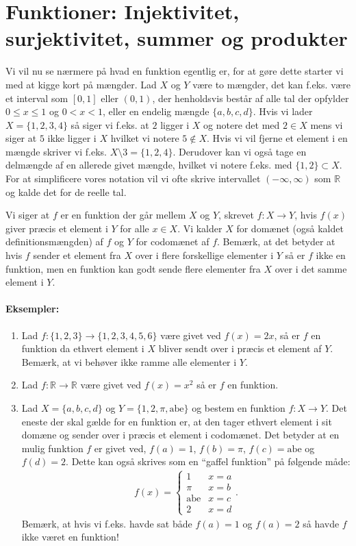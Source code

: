 \section{Funktioner: Injektivitet, surjektivitet, summer og produkter}
Vi vil nu se nærmere på hvad en funktion egentlig er, for at gøre dette starter vi med at kigge kort på mængder. Lad $X$ og $Y$ være to mængder, det kan f.eks. være et interval som $[0,1]$ eller $(0,1)$, der henholdsvis består af alle tal der opfylder $0 \leq x \leq 1$ og $0 < x < 1$, eller en endelig mængde $\{a,b,c,d\}$. Hvis vi lader $X = \{1,2,3,4\}$ så siger vi f.eks. at $2$ ligger i $X$ og notere det med $2 \in X$ mens vi siger at $5$ ikke ligger i $X$ hvilket vi notere $5 \not\in X$. Hvis vi vil fjerne et element i en mængde skriver vi f.eks. $X \setminus 3 = \{1,2,4\}$. Derudover kan vi også tage en delmængde af en allerede givet mængde, hvilket vi notere f.eks. med $\{1,2\} \subset X$. For at simplificere vores notation vil vi ofte skrive intervallet $(-\infty,\infty)$ som $\mathbb{R}$ og kalde det for de reelle tal. 



Vi siger at $f$ er en funktion der går mellem $X$ og $Y$, skrevet $f \colon X \to Y$, hvis $f(x)$ giver præcis et element i $Y$ for alle $x \in X$. Vi kalder $X$ for domænet (også kaldet definitionsmængden) af $f$ og $Y$ for codomænet af $f$. Bemærk, at det betyder at hvis $f$ sender et element fra $X$ over i flere forskellige elementer i $Y$ så er $f$ ikke en funktion, men en funktion kan godt sende flere elementer fra $X$ over i det samme element i $Y$.

\paragraph*{Eksempler:}
\begin{enumerate}
\item Lad $f \colon \{1,2,3\} \to \{1,2,3,4,5,6\}$ være givet ved $f(x)=2x$, så er $f$ en funktion da ethvert element i $X$ bliver sendt over i præcis et element af $Y$. Bemærk, at vi behøver ikke ramme alle elementer i $Y$. 
\item Lad $f \colon \mathbb{R} \to \mathbb{R}$ være givet ved $f(x)=x^2$ så er $f$ en funktion.
\item Lad $X=\{a,b,c,d\}$ og $Y=\{1,2,\pi,\mathrm{abe}\}$ og bestem en funktion $f\colon X \to Y$. Det eneste der skal gælde for en funktion er, at den tager ethvert element i sit domæne og sender over i præcis et element i codomænet. Det  betyder at en mulig funktion $f$ er givet ved, $f(a)=1$, $f(b)=\pi$, $f(c)=\mathrm{abe}$  og $f(d)=2$. Dette kan også skrives som en ``gaffel funktion'' på følgende måde:
\begin{align*}
f (x) = \begin{cases} 
1 & x=a \\
\pi & x= b\\
\mathrm{abe} & x=c\\
2 & x=d
\end{cases}.
\end{align*}
Bemærk, at hvis vi f.eks. havde sat både $f(a)=1$ og $f(a)=2$ så havde $f$ ikke været en funktion!
\end{enumerate}

